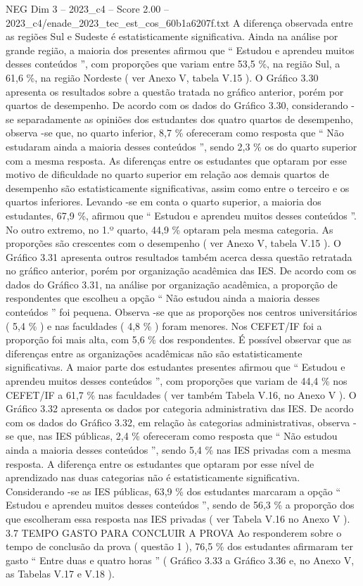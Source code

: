 \begin{textsample}{NEG Dim 3 – 2023\_c4 – Score 2.00 – 2023\_c4/enade\_2023\_tec\_est\_cos\_60b1a6207f.txt}
A diferença observada entre as regiões Sul e Sudeste é estatisticamente significativa.
Ainda na análise por grande região, a maioria dos presentes afirmou que “ Estudou e aprendeu muitos desses conteúdos ”, com proporções que variam entre 53,5 \%, na região Sul, a 61,6 \%, na região Nordeste ( ver Anexo V, tabela V.15 ).
O Gráfico 3.30 apresenta os resultados sobre a questão tratada no gráfico anterior, porém por quartos de desempenho.
De acordo com os dados do Gráfico 3.30, considerando -se separadamente as opiniões dos estudantes dos quatro quartos de desempenho, observa -se que, no quarto inferior, 8,7 \% ofereceram como resposta que “ Não estudaram ainda a maioria desses conteúdos ”, sendo 2,3 \% os do quarto superior com a mesma resposta.
As diferenças entre os estudantes que optaram por esse motivo de dificuldade no quarto superior em relação aos demais quartos de desempenho são estatisticamente significativas, assim como entre o terceiro e os quartos inferiores.
Levando -se em conta o quarto superior, a maioria dos estudantes, 67,9 \%, afirmou que “ Estudou e aprendeu muitos desses conteúdos ”.
No outro extremo, no 1.º quarto, 44,9 \% optaram pela mesma categoria.
As proporções são crescentes com o desempenho ( ver Anexo V, tabela V.15 ).
O Gráfico 3.31 apresenta outros resultados também acerca dessa questão retratada no gráfico anterior, porém por organização acadêmica das IES.
De acordo com os dados do Gráfico 3.31, na análise por organização acadêmica, a proporção de respondentes que escolheu a opção “ Não estudou ainda a maioria desses conteúdos ” foi pequena.
Observa -se que as proporções nos centros universitários ( 5,4 \% ) e nas faculdades ( 4,8 \% ) foram menores.
Nos CEFET/IF foi a proporção foi mais alta, com 5,6 \% dos respondentes.
É possível observar que as diferenças entre as organizações acadêmicas não são estatisticamente significativas.
A maior parte dos estudantes presentes afirmou que “ Estudou e aprendeu muitos desses conteúdos ”, com proporções que variam de 44,4 \% nos CEFET/IF a 61,7 \% nas faculdades ( ver também Tabela V.16, no Anexo V ).
O Gráfico 3.32 apresenta os dados por categoria administrativa das IES.
De acordo com os dados do Gráfico 3.32, em relação às categorias administrativas, observa -se que, nas IES públicas, 2,4 \% ofereceram como resposta que “ Não estudou ainda a maioria desses conteúdos ”, sendo 5,4 \% nas IES privadas com a mesma resposta.
A diferença entre os estudantes que optaram por esse nível de aprendizado nas duas categorias não é estatisticamente significativa.
Considerando -se as IES públicas, 63,9 \% dos estudantes marcaram a opção “ Estudou e aprendeu muitos desses conteúdos ”, sendo de 56,3 \% a proporção dos que escolheram essa resposta nas IES privadas ( ver Tabela V.16 no Anexo V ). 3.7 TEMPO GASTO PARA CONCLUIR A PROVA Ao responderem sobre o tempo de conclusão da prova ( questão 1 ), 76,5 \% dos estudantes afirmaram ter gasto “ Entre duas e quatro horas ” ( Gráfico 3.33 a Gráfico 3.36 e, no Anexo V, as Tabelas V.17 e V.18 ).

\end{textsample}
